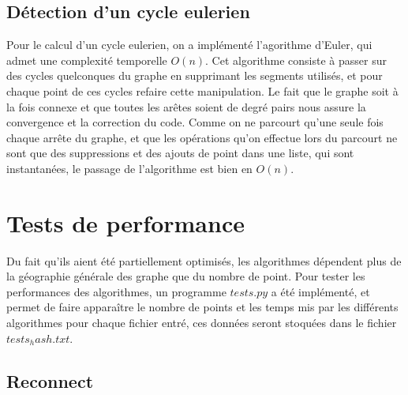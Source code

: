 \documentclass[a4paper,11pt]{article}
\begin{document}
\subsection{Détection d'un cycle eulerien}

Pour le calcul d'un cycle eulerien, on a implémenté l'agorithme d'Euler, qui admet une complexité temporelle $O(n)$. Cet algorithme consiste à passer sur des cycles quelconques du graphe en supprimant les segments
utilisés, et pour chaque point de ces cycles refaire cette manipulation. Le fait que le graphe soit à la fois connexe et que toutes
les arêtes soient de degré pairs nous assure la convergence et la correction du code. Comme on ne parcourt qu'une seule fois
chaque arrête du graphe, et que les opérations qu'on effectue lors du parcourt ne sont que des suppressions et des ajouts
de point dans une liste, qui sont instantanées, le passage de l'algorithme est bien en $O(n)$.

\section{Tests de performance}

Du fait qu'ils aient été partiellement optimisés, les algorithmes dépendent plus de la géographie générale des
graphe que du nombre de point.
Pour tester les performances des algorithmes, un programme $tests.py$ a été implémenté, et permet de faire
apparaître le nombre de points et les temps mis par les différents algorithmes pour chaque fichier entré, ces données seront
stoquées dans le fichier $tests_hash.txt$.

\subsection{Reconnect}
\end{document}
